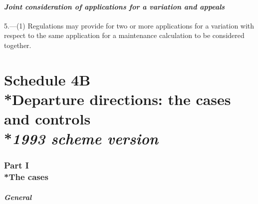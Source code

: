 \documentclass[12pt,a4paper]{article}
\begin{document}

\subsection*{\itshape Joint consideration of applications for a variation and appeals}

5.---(1) Regulations may provide for two or more applications for a variation with respect to the same application for a maintenance calculation to be considered together.




\part[Schedule 4B --- Departure directions: the cases and controls --- \emph{1993 scheme version}]{Schedule 4B\\*Departure directions: the cases and controls\\*\emph{1993 scheme version}}


\section[Part I --- The cases]{Part I\\*The cases}

\renewcommand\parthead{--- Schedule 4B Part I}

\subsection*{\itshape General}
\end{document}
